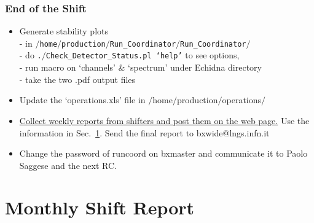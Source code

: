 \documentclass[a4paper,10pt]{article}
\begin{document}
 \subsubsection{End of the Shift}
\begin{itemize}
 \item Generate stability plots \\
  - in \texttt{$/$home$/$production$/$Run\_Coordinator$/$Run\_Coordinator$/$} \\
  - do \texttt{.$/$Check\_Detector\_Status.pl `help'} to see options, \\
  - run macro on `channels' \& `spectrum' under Echidna directory \\
  - take the two .pdf output files 
 
 \item Update the `operations.xls' file in $/$home$/$production$/$operations$/$
\item \underline{Collect weekly reports from shifters and post them on the web page.} Use the information in Sec.~\ref{sec:report}. Send the final report to bxwide@lngs.infn.it
\item Change the password of runcoord on bxmaster and communicate it to Paolo Saggese and the next RC.
\end{itemize}


\section{Monthly Shift Report}
\label{sec:report}
\end{document}
